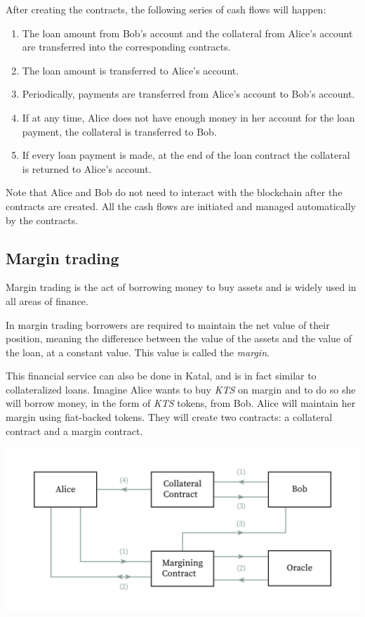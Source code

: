 \documentclass[conference]{IEEEtran}
\begin{document}
After creating the contracts, the following series of cash flows will happen:

\begin{enumerate}
	\item The loan amount from Bob's account and the collateral from Alice's account are transferred into the corresponding contracts.
	\item The loan amount is transferred to Alice's account.
	\item Periodically, payments are transferred from Alice's account to Bob's account.
	\item If at any time, Alice does not have enough money in her account for the loan payment, the collateral is transferred to Bob.
	\item If every loan payment is made, at the end of the loan contract the collateral is returned to Alice's account.
\end{enumerate}

Note that Alice and Bob do not need to interact with the blockchain after the contracts are created. All the cash flows are initiated and managed automatically by the contracts.

\subsection{Margin trading}
Margin trading is the act of borrowing money to buy assets and is widely used in all areas of finance.

In margin trading borrowers are required to maintain the net value of their position, meaning the difference between the value of the assets and the value of the loan, at a constant value. This value is called the \textit{margin}.

This financial service can also be done in Katal, and is in fact similar to collateralized loans. Imagine Alice wants to buy \textit{KTS} on margin and to do so she will borrow money, in the form of \textit{KTS} tokens, from Bob. Alice will maintain her margin using fiat-backed tokens. They will create two contracts: a collateral contract and a margin contract.

\includegraphics[width=\linewidth]{images/margin_trading.jpg}
\end{document}
